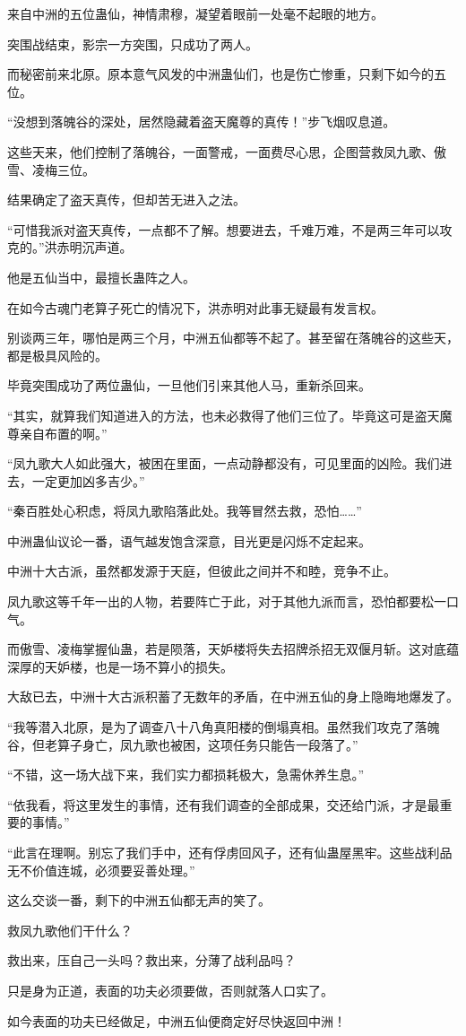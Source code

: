 \begin{this_body}
来自中洲的五位蛊仙，神情肃穆，凝望着眼前一处毫不起眼的地方。

突围战结束，影宗一方突围，只成功了两人。

而秘密前来北原。原本意气风发的中洲蛊仙们，也是伤亡惨重，只剩下如今的五位。

“没想到落魄谷的深处，居然隐藏着盗天魔尊的真传！”步飞烟叹息道。

这些天来，他们控制了落魄谷，一面警戒，一面费尽心思，企图营救凤九歌、傲雪、凌梅三位。

结果确定了盗天真传，但却苦无进入之法。

“可惜我派对盗天真传，一点都不了解。想要进去，千难万难，不是两三年可以攻克的。”洪赤明沉声道。

他是五仙当中，最擅长蛊阵之人。

在如今古魂门老算子死亡的情况下，洪赤明对此事无疑最有发言权。

别谈两三年，哪怕是两三个月，中洲五仙都等不起了。甚至留在落魄谷的这些天，都是极具风险的。

毕竟突围成功了两位蛊仙，一旦他们引来其他人马，重新杀回来。

“其实，就算我们知道进入的方法，也未必救得了他们三位了。毕竟这可是盗天魔尊亲自布置的啊。”

“凤九歌大人如此强大，被困在里面，一点动静都没有，可见里面的凶险。我们进去，一定更加凶多吉少。”

“秦百胜处心积虑，将凤九歌陷落此处。我等冒然去救，恐怕……”

中洲蛊仙议论一番，语气越发饱含深意，目光更是闪烁不定起来。

中洲十大古派，虽然都发源于天庭，但彼此之间并不和睦，竞争不止。

凤九歌这等千年一出的人物，若要阵亡于此，对于其他九派而言，恐怕都要松一口气。

而傲雪、凌梅掌握仙蛊，若是陨落，天妒楼将失去招牌杀招无双偃月斩。这对底蕴深厚的天妒楼，也是一场不算小的损失。

大敌已去，中洲十大古派积蓄了无数年的矛盾，在中洲五仙的身上隐晦地爆发了。

“我等潜入北原，是为了调查八十八角真阳楼的倒塌真相。虽然我们攻克了落魄谷，但老算子身亡，凤九歌也被困，这项任务只能告一段落了。”

“不错，这一场大战下来，我们实力都损耗极大，急需休养生息。”

“依我看，将这里发生的事情，还有我们调查的全部成果，交还给门派，才是最重要的事情。”

“此言在理啊。别忘了我们手中，还有俘虏回风子，还有仙蛊屋黑牢。这些战利品无不价值连城，必须要妥善处理。”

这么交谈一番，剩下的中洲五仙都无声的笑了。

救凤九歌他们干什么？

救出来，压自己一头吗？救出来，分薄了战利品吗？

只是身为正道，表面的功夫必须要做，否则就落人口实了。

如今表面的功夫已经做足，中洲五仙便商定好尽快返回中洲！

\end{this_body}

